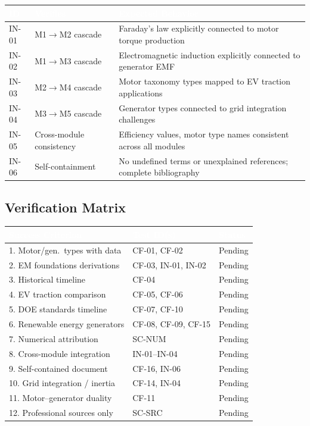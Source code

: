 \documentclass[11pt,letterpaper]{article}
\newcommand{\tableheader}[1]{\textbf{\sffamily\textcolor{white}{#1}}}
\begin{document}
\begin{center}
\begin{tabularx}{\textwidth}{C{1.2cm}L{3cm}X}
\toprule
{}
\tableheader{ID} & \tableheader{Verifies} & \tableheader{Expected Behavior} \\
\midrule
IN-01 & M1$\rightarrow$M2 cascade & Faraday's law explicitly connected to motor torque production \\
IN-02 & M1$\rightarrow$M3 cascade & Electromagnetic induction explicitly connected to generator EMF \\
IN-03 & M2$\rightarrow$M4 cascade & Motor taxonomy types mapped to EV traction applications \\
IN-04 & M3$\rightarrow$M5 cascade & Generator types connected to grid integration challenges \\
IN-05 & Cross-module consistency & Efficiency values, motor type names consistent across all modules \\
IN-06 & Self-containment & No undefined terms or unexplained references; complete bibliography \\
\bottomrule
\end{tabularx}
\end{center}

\subsection{Verification Matrix}

\begin{center}
\begin{tabularx}{\textwidth}{XL{3cm}C{1.5cm}}
\toprule
{}
\tableheader{Success Criterion} & \tableheader{Test ID(s)} & \tableheader{Status} \\
. Motor/gen.\ types with data & CF-01, CF-02 & Pending \\
2. EM foundations derivations & CF-03, IN-01, IN-02 & Pending \\
3. Historical timeline & CF-04 & Pending \\
4. EV traction comparison & CF-05, CF-06 & Pending \\
5. DOE standards timeline & CF-07, CF-10 & Pending \\
6. Renewable energy generators & CF-08, CF-09, CF-15 & Pending \\
7. Numerical attribution & SC-NUM & Pending \\
8. Cross-module integration & IN-01--IN-04 & Pending \\
9. Self-contained document & CF-16, IN-06 & Pending \\
10. Grid integration / inertia & CF-14, IN-04 & Pending \\
11. Motor--generator duality & CF-11 & Pending \\
12. Professional sources only & SC-SRC & Pending \\
\bottomrule
\end{tabularx}
\end{center}
\end{document}

